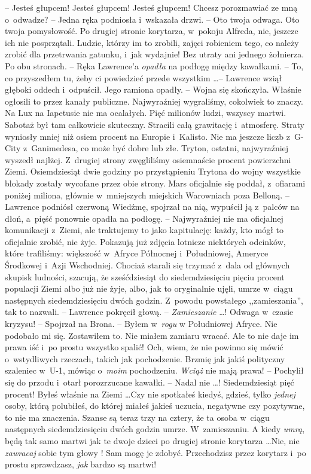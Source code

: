 \documentclass[oneside,polish,11pt,rmheadings]{mwbk}
\begin{document}
-- Jesteś głupcem! Jesteś głupcem! Jesteś głupcem! Chcesz porozmawiać ze mną o~odwadze? -- Jedna ręka podniosła i~wskazała drzwi. -- Oto twoja odwaga. Oto twoja pomysłowość. Po drugiej stronie korytarza, w~pokoju Alfreda, nie, jeszcze ich nie posprzątali. Ludzie, którzy im to zrobili, zajęci robieniem tego, co należy zrobić dla przetrwania gatunku, i~jak wydajnie! Bez utraty ani jednego żołnierza. Po obu stronach. -- Ręka Lawrence'a \textit{opadła }na podłogę między kawałkami. -- To, co przyszedłem tu, żeby ci powiedzieć przede wszystkim \ldots  -- Lawrence wziął głęboki oddech i~odpuścił. Jego ramiona opadły. -- Wojna się skończyła. Właśnie ogłosili to przez kanały publiczne. Najwyraźniej wygraliśmy, cokolwiek to znaczy. Na Lux na Iapetusie nie ma ocalałych. Pięć milionów ludzi, wszyscy martwi. Sabotaż był tam całkowicie skuteczny. Stracili całą grawitację i~atmosferę. Straty wyniosły mniej niż osiem procent na Europie i~Kalisto. Nie ma jeszcze liczb z~G-City z~Ganimedesa, co może być dobre lub złe. Tryton, ostatni, najwyraźniej wyszedł najlżej. Z~drugiej strony zwęgliliśmy osiemnaście procent powierzchni Ziemi. Osiemdziesiąt dwie godziny po przystąpieniu Trytona do wojny wszystkie blokady zostały wycofane przez obie strony. Mars oficjalnie się poddał, z~ofiarami poniżej miliona, głównie w~mniejszych miejskich Warowniach poza Belloną. -- Lawrence podniósł czerwoną Wiedźmę, spojrzał na nią, wypuścił ją z~palców na dłoń, a~pięść ponownie opadła na podłogę. -- Najwyraźniej nie ma oficjalnej komunikacji z~Ziemi, ale traktujemy to jako kapitulację: każdy, kto mógł to oficjalnie zrobić, nie żyje. Pokazują już zdjęcia lotnicze niektórych odcinków, które trafiliśmy: większość w~Afryce Północnej i~Południowej, Ameryce Środkowej i~Azji Wschodniej. Chociaż starali się trzymać z~dala od głównych skupisk ludności, szacują, że sześćdziesiąt do siedemdziesięciu pięciu procent populacji Ziemi albo już nie żyje, albo, jak to oryginalnie ujęli, umrze w~ciągu następnych siedemdziesięciu dwóch godzin. Z~powodu powstałego ,,zamieszania'', tak to nazwali. -- Lawrence pokręcił głową. -- \textit{ Zamieszanie } \ldots ! Odwaga w~czasie kryzysu! -- Spojrzał na Brona. -- Byłem w~\textit{rogu }w Południowej Afryce. Nie podobało mi się. Zostawiłem to. Nie miałem zamiaru wracać. Ale to nie daje im prawa iść i~po prostu wszystko spalić! Och, wiem, że nie powinno się mówić o~wstydliwych rzeczach, takich jak pochodzenie. Brzmię jak jakiś polityczny szaleniec w~U-1, mówiąc o~\textit{moim }pochodzeniu. \textit{Wciąż }nie mają prawa! --  Pochylił się do przodu i~otarł porozrzucane kawałki. -- Nadal nie \ldots  ! Siedemdziesiąt pięć procent! Byłeś właśnie na Ziemi \ldots   Czy nie spotkałeś kiedyś, gdzieś, tylko \textit{jednej }osoby, którą polubiłeś, do której miałeś jakieś uczucia, negatywne czy pozytywne, to nie ma znaczenia. Szanse są teraz trzy na cztery, że ta osoba w~ciągu następnych siedemdziesięciu dwóch godzin umrze. W~zamieszaniu. A kiedy \textit{umrą}, będą tak samo martwi jak te dwoje dzieci po drugiej stronie korytarza \ldots  Nie, nie \textit{zawracaj }sobie tym głowy ! Sam mogę je zdobyć. Przechodzisz przez korytarz i~po prostu sprawdzasz, \textit{jak }bardzo są martwi!
\end{document}
